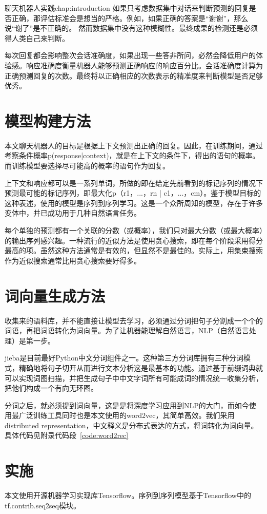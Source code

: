 \begin{cuzchapter}{聊天机器人实践}{chap:introduction}
如果只考虑数据集中对话来判断预测的回复是否正确，那评估标准会是想当的严格。例如，如果正确的答案是“谢谢”，那么说“谢了”是不正确的。 然而数据集中没有这种模糊性。最终成果的检测还是必须得人类自己来判断。

每次回复都会影响整次会话准确度，如果出现一些答非所问，必然会降低用户的体验感。响应准确度衡量机器人能够预测正确响应的响应百分比。会话准确度计算为正确预测回复的次数。最终将以正确相应的次数表示的精准度来判断模型是否足够优秀。
\section{模型构建方法}\label{sec:background}
本文聊天机器人的目标是根据上下文预测出正确的回复。因此，在训练期间，通过考察条件概率p(response|context)，就是在上下文的条件下，得出的语句的概率。而训练模型要选择尽可能高的概率的语句作为回复。

上下文和响应都可以是一系列单词，所做的即在给定先前看到的标记序列的情况下预测最可能的标记序列，即最大化p（r1，...，rn | c1，...，cm）。鉴于模型目标的这种表述，使用的模型是序列到序列学习。这是一个众所周知的模型，存在于许多变体中，并已成功用于几种自然语言任务。

每个单独的预测都有一个关联的分数（或概率），我们只对最大分数（或最大概率）的输出序列感兴趣。一种流行的近似方法是使用贪心搜索，即在每个阶段采用得分最高的项。虽然这种方法通常是有效的，但显然不是最佳的。实际上，用集束搜索作为近似搜索通常比用贪心搜索要好得多。
\section{词向量生成方法}\label{sec:background}
收集来的语料库，并不能直接让模型去学习，必须通过分词把句子分割成一个个的词语，再把词语转化为词向量。为了让机器能理解自然语言，NLP（自然语言处理）是第一步。

jieba是目前最好Python中文分词组件之一。这种第三方分词库拥有三种分词模式，精确地将句子切开从而进行文本分析这是最基本的功能。通过基于前缀词典就可以实现词图扫描，并把生成句子中中文字词所有可能成词的情况统一收集分析，把他们构成一个有向无环图。

分词之后，就必须提到词向量，这是是将深度学习应用到NLP的大门，而如今使用最广泛训练工具同时也是本文使用的word2vec，其简单高效。我们采用distributed representation，中文释义是分布式表达的方式，将词转化为词向量。具体代码见附录代码段~\ref{code:word2rec}

\section{实施}\label{sec:background}
本文使用开源机器学习实现库Tensorflow。序列到序列模型基于Tensorflow中的tf.contrib.seq2seq模块。


\end{cuzchapter}
